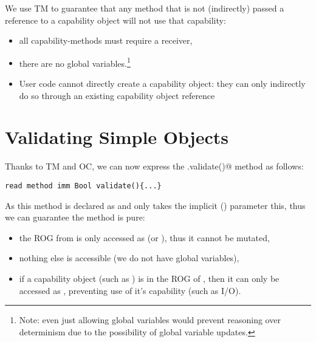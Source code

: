 We use TM to guarantee that any method that is not (indirectly) passed a \Q@mut@ reference to a capability object will not use that capability:
\begin{itemize}
\item all capability-methods must require a \Q@mut@ receiver,
\item there are no global variables.\footnote{Note: even just allowing \Q@imm@
global variables would prevent reasoning over determinism due to the possibility of global variable updates.}
\item User code cannot directly create a capability object: they can only indirectly do so through an existing \Q@mut@ capability object reference

\end{itemize}






\section{Validating Simple Objects}

Thanks to TM and OC, we can now express the \Q@.validate()@ method as follows:
\saveSpace
\begin{lstlisting}
read method imm Bool validate(){...}
\end{lstlisting}
\saveSpace

As this method is declared as \Q@read@ and only takes the implicit (\Q@read@) parameter this, thus we can guarantee the method is pure:
\begin{itemize}
\item the ROG from \Q@this@ is only accessed as \Q@read@ (or \Q@imm@), thus it cannot be mutated,
\item nothing else is accessible (we do not have global variables),
\item if a capability object (such as \Q@System@) is in the ROG of \Q@this@, then it can only be accessed as \Q@read@, preventing use of it's capability (such as I/O).
\end{itemize}

